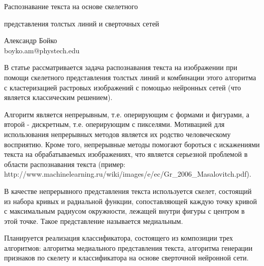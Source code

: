 \documentclass[12pt]{article}
\theoremstyle{definiton}
\theoremstyle{definition}
\theoremstyle{definition}
\begin{document}
\centerline{\Large Распознавание текста на основе скелетного}
\centerline{\Large представления толстых линий и сверточных
сетей}


\medskip

\begin{center}
	{\Large Александр Бойко \\ \small boyko.am@phystech.edu }
\end{center}
В статье рассматривается задача распознавания текста на изображении при помощи скелетного представления толстых линий и комбинации этого алгоритма с кластеризацией растровых изображений с помощью нейронных сетей (что является классическим решением). \par
Алгоритм является непрерывным, т.е. оперирующим с формами и фигурами, а второй - дискретным, т.е. оперирующим с пикселями. Мотивацией для использования непрерывных методов является их родство человеческому восприятию. Кроме того, непрерывные методы помогают бороться с искажениями текста на обрабатываемых изображениях, что является серьезной проблемой в области распознавания текста (пример: http://www.machinelearning.ru/wiki/images/e/ec/Gr_2006_Masalovitch.pdf). \par В качестве непрерывного представления текста используется скелет, состоящий из набора кривых и радиальной функции, сопоставляющей каждую точку кривой с максимальным радиусом окружности, лежащей внутри фигуры с центром в этой точке. Такое представление называется медиальным. \par
Планируется реализация классификатора, состоящего из композиции трех алгоритмов: алгоритма медиального представления текста, алгоритма генерации признаков по скелету и классификатора на основе сверточной нейронной сети.
\end{document}

